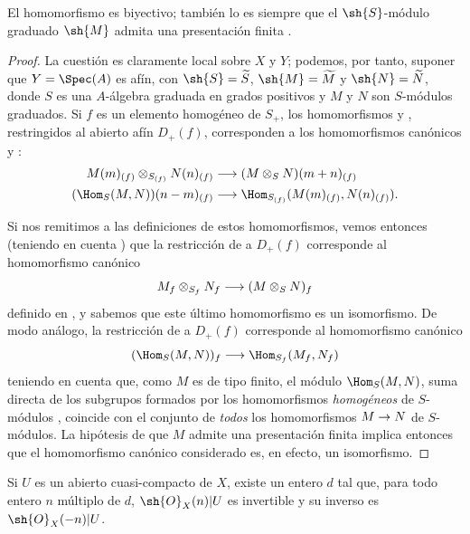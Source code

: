 \documentclass[oneside,10pt]{amsart}
\makeatletter
\newcommand{\ega@arrow}[2]{\mathchoice{#1}{#2}{#2}{#2}}
\renewcommand{\to}{\ega@arrow{\longrightarrow}{\rightarrow}}
\let\EGAOriginalLabel\label
\renewcommand{\label}[1]{\phantomsection\EGAOriginalLabel{#1}}
\makeatother
\begin{document}
\begin{proposition}[8.14.3]
\label{II.8.14.3}
El homomorfismo  es biyectivo;
también lo es  siempre que el $\sh{S}$-módulo graduado $\sh{M}$ admita una presentación finita .
\end{proposition}

\begin{proof}
La cuestión es claramente local sobre $X$ y $Y$;
podemos, por tanto, suponer que $Y=\Spec(A)$ es afín, con $\sh{S}=\widetilde{S}$, $\sh{M}=\widetilde{M}$ y $\sh{N}=\widetilde{N}$, donde $S$ es una $A$-álgebra graduada en grados positivos y $M$ y $N$ son $S$-módulos graduados.
Si $f$ es un elemento homogéneo de $S_+$, los homomorfismos  y , restringidos al abierto afín $D_+(f)$, corresponden a los homomorfismos canónicos  y :
\begin{align*}
    M(m)_{(f)}\otimes_{S_{(f)}}N(n)_{(f)}
    &\to
    (M\otimes_S N)(m+n)_{(f)}
\\  (\Hom_S(M,N))(n-m)_{(f)}
    &\to
    \Hom_{S_{(f)}}(M(m)_{(f)},N(n)_{(f)}).
\end{align*}

Si nos remitimos a las definiciones de estos homomorfismos, vemos entonces (teniendo en cuenta ) que la restricción de  a $D_+(f)$ corresponde al homomorfismo canónico
\[
    M_f\otimes_{S_f}N_f \to (M\otimes_S N)_f
\]
definido en , y sabemos que este último homomorfismo es un isomorfismo.
De modo análogo, la restricción de  a $D_+(f)$ corresponde al homomorfismo canónico 
\[
    (\Hom_S(M,N))_f \to \Hom_{S_f}(M_f,N_f)
\]
teniendo en cuenta que, como $M$ es de tipo finito, el módulo $\Hom_S(M,N)$, suma directa de los subgrupos formados por los homomorfismos \emph{homogéneos} de $S$-módulos , coincide con el conjunto de \emph{todos} los homomorfismos $M\to N$ de $S$-módulos.
La hipótesis de que $M$ admite una presentación finita implica entonces  que el homomorfismo canónico considerado es, en efecto, un isomorfismo.
\end{proof}

\begin{proposition}[8.14.4]
\label{II.8.14.4}
Si $U$ es un abierto cuasi-compacto de $X$, existe un entero $d$ tal que, para todo entero $n$ múltiplo de $d$, $\sh{O}_X(n)|U$ es invertible y su inverso es $\sh{O}_X(-n)|U$.
\end{proposition}
\end{document}
